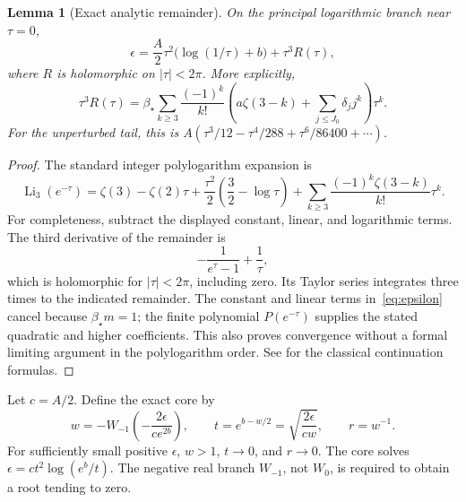 \documentclass[11pt,a4paper]{article}
\numberwithin{equation}{section}
\newtheorem{lemma}[theorem]{Lemma}
\theoremstyle{definition}
\theoremstyle{remark}
\DeclareMathOperator{\Li}{Li}
\newcommand{\bs}{\beta_\star}
\begin{document}
\begin{lemma}[Exact analytic remainder]
\label{lem:normal}
On the principal logarithmic branch near \(\tau=0\),
\begin{equation}
 \epsilon=\frac A2\tau^2\bigl(\log(1/\tau)+b\bigr)+\tau^3 R(\tau),
 \label{eq:normal}
\end{equation}
where \(R\) is holomorphic on \(|\tau|<2\pi\). More explicitly,
\begin{equation}
 \tau^3R(\tau)=\bs\sum_{k\ge3}
 \frac{(-1)^k}{k!}
 \left(a\zeta(3-k)+\sum_{j\le J_0}\delta_jj^k\right)\tau^k.
 \label{eq:R-series}
\end{equation}
For the unperturbed tail, this is
\(A(\tau^3/12-\tau^4/288+\tau^6/86400+\cdots)\).
\end{lemma}
\begin{proof}
The standard integer polylogarithm expansion is
\[
 \Li_3(e^{-\tau})=\zeta(3)-\zeta(2)\tau+
 \frac{\tau^2}{2}\left(\frac32-\log\tau\right)
 +\sum_{k\ge3}\frac{(-1)^k\zeta(3-k)}{k!}\tau^k.
\]
For completeness, subtract the displayed constant, linear, and logarithmic
terms. The third derivative of the remainder is
\[
 -\frac1{e^\tau-1}+\frac1\tau,
\]
which is holomorphic for \(|\tau|<2\pi\), including zero. Its Taylor series
integrates three times to the indicated remainder. The constant and linear
terms in~\eqref{eq:epsilon} cancel because \(\bs m=1\); the finite polynomial
\(P(e^{-\tau})\) supplies the stated quadratic and higher coefficients.
This also proves convergence without a formal limiting argument in the
polylogarithm order. See \cite{dlmf-polylog} for the classical continuation
formulas.
\end{proof}

Let \(c=A/2\). Define the exact core by
\begin{equation}
 w=-W_{-1}\!\left(-\frac{2\epsilon}{ce^{2b}}\right),\qquad
 t=e^{b-w/2}=\sqrt{\frac{2\epsilon}{cw}},\qquad r=w^{-1}.
 \label{eq:core}
\end{equation}
For sufficiently small positive \(\epsilon\), \(w>1\), \(t\to0\), and
\(r\to0\). The core solves
\(\epsilon=ct^2\log(e^b/t)\). The negative real branch \(W_{-1}\), not
\(W_0\), is required to obtain a root tending to zero.
\end{document}
